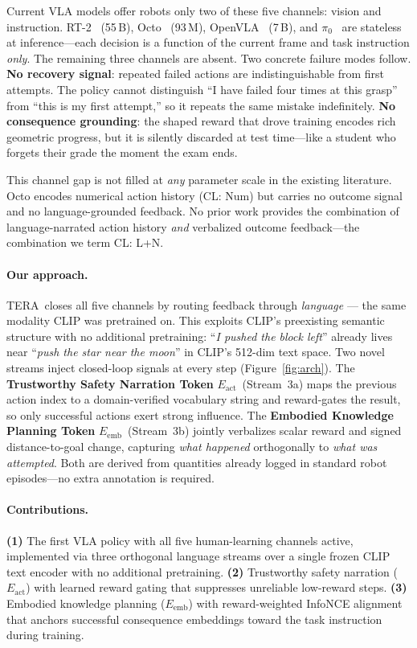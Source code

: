 \documentclass{article}
\newcommand{\modelname}{\textsc{TERA}\xspace}
\newcommand{\Lact}{$E_{\mathrm{act}}$\xspace}
\newcommand{\Lexp}{$E_{\mathrm{emb}}$\xspace}
\begin{document}
Current VLA models offer robots only two of these five channels: vision and
instruction.
RT-2~\citep{brohan2023rt2} (55\,B), Octo~\citep{octo2024} (93\,M),
OpenVLA~\citep{kim2024openvla} (7\,B), and $\pi_0$~\citep{black2024pi0}
are stateless at inference---each decision is a function of the current frame
and task instruction \emph{only}.
The remaining three channels are absent.
Two concrete failure modes follow.
\textbf{No recovery signal}: repeated failed actions are indistinguishable from
first attempts.
The policy cannot distinguish ``I have failed four times at this grasp'' from
``this is my first attempt,'' so it repeats the same mistake indefinitely.
\textbf{No consequence grounding}: the shaped reward that drove training encodes
rich geometric progress, but it is silently discarded at test time---like a
student who forgets their grade the moment the exam ends.

This channel gap is not filled at \emph{any} parameter scale in the existing
literature.
Octo encodes numerical action history (CL: Num) but carries no outcome signal
and no language-grounded feedback.
No prior work provides the combination of language-narrated action history
\emph{and} verbalized outcome feedback---the combination we term CL: L+N.

\paragraph{Our approach.}
\modelname\ closes all five channels by routing feedback through \emph{language}
--- the same modality CLIP was pretrained on.
This exploits CLIP's preexisting semantic structure with no additional
pretraining: ``\emph{I pushed the block left}'' already lives near
``\emph{push the star near the moon}'' in CLIP's 512-dim text space.
Two novel streams inject closed-loop signals at every step
(Figure~\ref{fig:arch}).
The \textbf{Trustworthy Safety Narration Token} \Lact\ (Stream~3a) maps the
previous action index to a domain-verified vocabulary string and reward-gates the
result, so only successful actions exert strong influence.
The \textbf{Embodied Knowledge Planning Token} \Lexp\ (Stream~3b) jointly
verbalizes scalar reward and signed distance-to-goal change, capturing
\emph{what happened} orthogonally to \emph{what was attempted}.
Both are derived from quantities already logged in standard robot episodes---no
extra annotation is required.

\paragraph{Contributions.}
\textbf{(1)} The first VLA policy with all five human-learning channels active,
implemented via three orthogonal language streams over a single frozen CLIP text
encoder with no additional pretraining.
\textbf{(2)} Trustworthy safety narration (\Lact) with learned reward gating
that suppresses unreliable low-reward steps.
\textbf{(3)} Embodied knowledge planning (\Lexp) with reward-weighted InfoNCE
alignment that anchors successful consequence embeddings toward the task
instruction during training.
\end{document}
